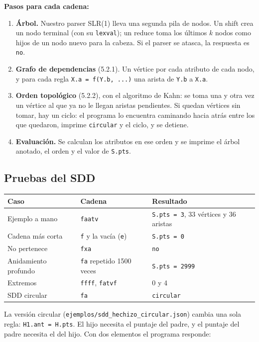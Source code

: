 \documentclass[11pt,a4paper]{article}
\newcommand{\code}[1]{\texttt{#1}}
\begin{document}
\textbf{Pasos para cada cadena:}
\begin{enumerate}
  \item \textbf{Árbol.} Nuestro parser SLR(1) lleva una segunda pila de nodos. Un shift crea un nodo terminal (con su \code{lexval}); un reduce toma los últimos $k$ nodos como hijos de un nodo nuevo para la cabeza. Si el parser se atasca, la respuesta es \code{no}.
  \item \textbf{Grafo de dependencias} (5.2.1). Un vértice por cada atributo de cada nodo, y para cada regla \code{X.a = f(Y.b, ...)} una arista de \code{Y.b} a \code{X.a}.
  \item \textbf{Orden topológico} (5.2.2), con el algoritmo de Kahn: se toma una y otra vez un vértice al que ya no le llegan aristas pendientes. Si quedan vértices sin tomar, hay un ciclo: el programa lo encuentra caminando hacia atrás entre los que quedaron, imprime \code{circular} y el ciclo, y se detiene.
  \item \textbf{Evaluación.} Se calculan los atributos en ese orden y se imprime el árbol anotado, el orden y el valor de \code{S.pts}.
\end{enumerate}

\subsection{Pruebas del SDD}

\begin{center}
\begin{tabular}{@{}lll@{}}
\toprule
Caso & Cadena & Resultado \\
\midrule
Ejemplo a mano & \code{faatv} & \code{S.pts = 3}, 33 vértices y 36 aristas \\
Cadena más corta & \code{f} y la vacía (\code{e}) & \code{S.pts = 0} \\
No pertenece & \code{fxa} & \code{no} \\
Anidamiento profundo & \code{fa} repetido 1500 veces & \code{S.pts = 2999} \\
Extremos & \code{ffff}, \code{fatvf} & 0 y 4 \\
SDD circular & \code{fa} & \code{circular} \\
\bottomrule
\end{tabular}
\end{center}

La versión circular (\code{ejemplos/sdd\_hechizo\_circular.json}) cambia una sola regla: \code{H1.ant = H.pts}. El hijo necesita el puntaje del padre, y el puntaje del padre necesita el del hijo. Con dos elementos el programa responde:
\end{document}
